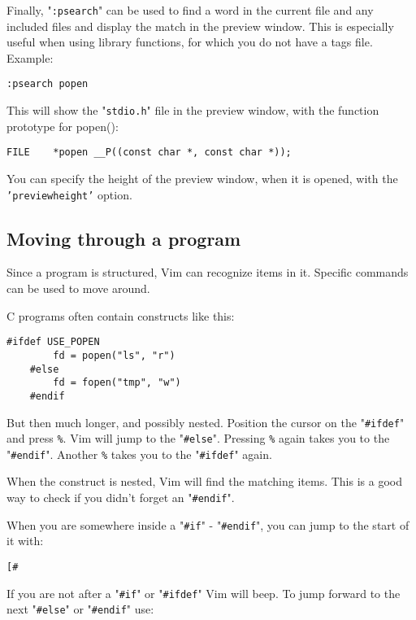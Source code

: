 Finally, "\texttt{:psearch}" can be used to find a word in the current file and any included files and display the match in the preview window.
This is especially useful when using library functions, for which you do not have a tags file.
Example:

\begin{Verbatim}[samepage=true]
 :psearch popen
\end{Verbatim}

This will show the "\texttt{stdio.h}" file in the preview window, with the function prototype for popen():

\begin{Verbatim}[samepage=true]
    FILE    *popen __P((const char *, const char *)); 
\end{Verbatim}

You can specify the height of the preview window, when it is opened, with the \texttt{'previewheight'} option.
\subsection{Moving through a program}
Since a program is structured, Vim can recognize items in it.
Specific commands can be used to move around.

C programs often contain constructs like this:

\begin{Verbatim}[samepage=true]
    #ifdef USE_POPEN 
        fd = popen("ls", "r") 
    #else 
        fd = fopen("tmp", "w") 
    #endif 
\end{Verbatim}

But then much longer, and possibly nested.
Position the cursor on the "\texttt{\#ifdef}" and press \texttt{\%}.
Vim will jump to the "\texttt{\#else}".
Pressing \texttt{\%} again takes you to the "\texttt{\#endif}".
Another \texttt{\%} takes you to the "\texttt{\#ifdef}" again.

When the construct is nested, Vim will find the matching items.
This is a good way to check if you didn't forget an "\texttt{\#endif}".

When you are somewhere inside a "\texttt{\#if}" - "\texttt{\#endif}", you can jump to the start of it with:

\begin{Verbatim}[samepage=true]
 [#
\end{Verbatim}

If you are not after a "\texttt{\#if}" or "\texttt{\#ifdef}" Vim will beep.
To jump forward to the next "\texttt{\#else}" or "\texttt{\#endif}" use:


